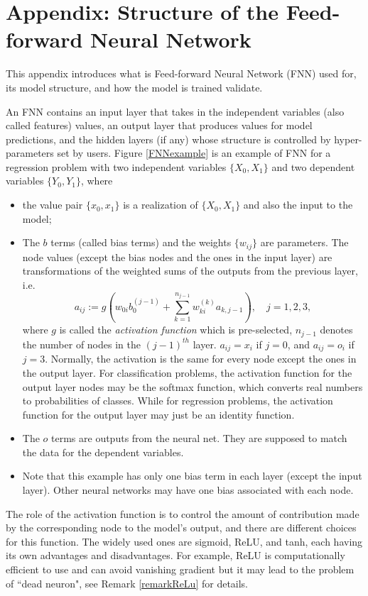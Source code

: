 \documentclass[thmsa,onecolumn,12pt]{article}%
\begin{document}
\section*{Appendix: Structure of the Feed-forward Neural Network}
\label{Appendix}

This appendix introduces what is Feed-forward Neural Network (FNN) used for, its model structure, and how the
model is trained validate.

An FNN contains an input layer that takes in the independent variables (also called features) values, an output layer that produces values for model predictions, and the hidden layers (if any) whose structure is controlled by hyper-parameters set by users. Figure \ref{FNNexample} is an example of FNN for a regression problem with two independent variables $\{X_0, X_1\}$ and two dependent variables $\{Y_0, Y_1\}$, where
\begin{itemize}
\item the value pair $\{x_0, x_1\}$ is a realization of $\{X_0, X_1\}$ and also the input to the model;
\item The $b$ terms (called bias terms) and the weights $\{w_{ij}\}$ are parameters. The node values (except the bias nodes and the ones in the input layer) are transformations of the weighted sums of the outputs from the previous layer, i.e.
\[ a_{ij} :=   g\left(w_{0i}b_0^{(j-1)}+\sum_{k=1}^{n_{j-1}}w_{ki}^{(k)}a_{k,j-1} \right),\quad j=1,2,3, \]
where $g$ is called the \textit{activation function} which is pre-selected, $n_{j-1}$ denotes the number of nodes in the $(j-1)^{th}$ layer. $a_{ij}=x_i$ if $j=0$, and $a_{ij}=o_i$ if $j=3$. Normally, the activation is the same for every node except the ones in the output layer. For classification problems, the activation function for the output layer nodes may be the softmax function, which converts real numbers to probabilities of classes. While for regression problems, the activation function for the output layer may just be an identity function.
\item The $o$ terms are outputs from the neural net. They are supposed to match the data for the dependent variables.
\item Note that this example has only one bias term in each layer (except the input layer). Other neural networks may have one bias associated with each node.
\end{itemize}
The role of the activation function is to control the amount of contribution made by the corresponding node to the model's output, and there are different choices for this function. The widely used ones are sigmoid, ReLU, and tanh, each having its own advantages and disadvantages. For example, ReLU is computationally efficient to use and can avoid vanishing gradient but it may lead to the problem of ``dead neuron", see Remark \ref{remarkReLu} for details.
\end{document}
